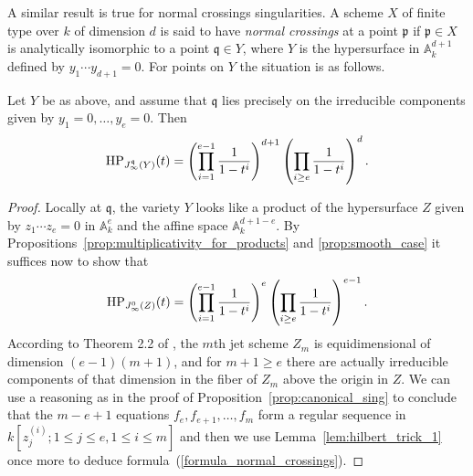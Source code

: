 A similar result is true for normal crossings singularities. A scheme $X$ of finite type over $k$ of dimension $d$ is said to have \textit{normal crossings} at a point $\mathfrak{p}$ if $\mathfrak{p}\in X$ is analytically isomorphic to a point $\mathfrak{q}\in Y$, where $Y$ is the hypersurface in $\mathbb{A}_k^{d+1}$ defined by $y_1\cdots y_{d+1} = 0$. For points on $Y$ the situation is as follows.

\begin{Prop}\label{prop:normal_crossings}
Let $Y$ be as above, and assume that $\mathfrak{q}$ lies precisely on the irreducible components given by $y_1=0,\ldots , y_e=0$. Then 
\[ \operatorname{HP}_{J_{\infty}^{\mathfrak{q}}(Y)}(t) =  \left(\prod_{i=1}^{e-1} \frac{1}{1-t^i}\right)^{d+1} \left(\prod_{i\geq e} \frac{1}{1-t^i}\right)^d .\]
\end{Prop}

\begin{proof}
Locally at $\mathfrak{q}$, the variety $Y$ looks like a product of the hypersurface $Z$ given by $z_1\cdots z_e =0$ in $\mathbb{A}^e_k$ and the affine space $\mathbb{A}^{d+1-e}_k$. By Propositions~\ref{prop:multiplicativity_for_products} and \ref{prop:smooth_case} it suffices now to show that 
\begin{equation}\label{formula_normal_crossings}  \operatorname{HP}_{J_{\infty}^{0}(Z)}(t)  =  \left(\prod_{i=1}^{e-1} \frac{1}{1-t^i}\right)^{e} \left(\prod_{i\geq e} \frac{1}{1-t^i}\right)^{e-1}.  \end{equation}
According to Theorem 2.2 of \cite{goward_smith}, the $m$th jet scheme $Z_m$ is equidimensional of dimension $(e-1)(m+1)$, and for $m+1\geq e$ there are actually irreducible components of that dimension in the fiber of $Z_m$ above the origin in $Z$. We can use a reasoning as in the proof of Proposition~\ref{prop:canonical_sing} to conclude that the $m-e+1$ equations $f_e,f_{e+1} , \ldots , f_m$ form a regular sequence in $k[z_j^{(i)}; 1\leq j \leq e, 1\leq i\leq m]$ and then we use Lemma~\ref{lem:hilbert_trick_1} once more to deduce formula~(\ref{formula_normal_crossings}).
\end{proof}